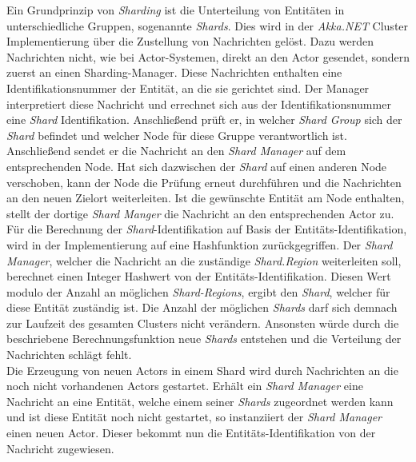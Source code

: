 Ein Grundprinzip von \textit{Sharding} ist die Unterteilung von Entitäten in unterschiedliche Gruppen, sogenannte \textit{Shards}. Dies wird in der \textit{Akka.NET} Cluster Implementierung über die Zustellung von Nachrichten gelöst. Dazu werden Nachrichten nicht, wie bei Actor-Systemen, direkt an den Actor gesendet, sondern zuerst an einen Sharding-Manager. Diese Nachrichten enthalten eine Identifikationsnummer der Entität, an die sie gerichtet sind. Der Manager interpretiert diese Nachricht und errechnet sich aus der Identifikationsnummer eine \textit{Shard} Identifikation. Anschließend prüft er, in welcher \textit{Shard Group} sich der \textit{Shard} befindet und welcher Node für diese Gruppe verantwortlich ist. Anschließend sendet er die Nachricht an den \textit{Shard Manager} auf dem entsprechenden Node. Hat sich dazwischen der \textit{Shard} auf einen anderen Node verschoben, kann der Node die Prüfung erneut durchführen und die Nachrichten an den neuen Zielort weiterleiten. Ist die gewünschte Entität am Node enthalten, stellt der dortige \textit{Shard Manger} die Nachricht an den entsprechenden Actor zu. \\
Für die Berechnung der \textit{Shard}-Identifikation auf Basis der Entitäts-Identifikation, wird in der Implementierung auf eine Hashfunktion zurückgegriffen. Der \textit{Shard Manager}, welcher die Nachricht an die zuständige \textit{Shard.Region} weiterleiten soll, berechnet einen Integer Hashwert von der Entitäts-Identifikation. Diesen Wert modulo der Anzahl an möglichen \textit{Shard-Regions}, ergibt den \textit{Shard}, welcher für diese Entität zuständig ist. Die Anzahl der möglichen \textit{Shards} darf sich demnach zur Laufzeit des gesamten Clusters nicht verändern. Ansonsten würde durch die beschriebene Berechnungsfunktion neue \textit{Shards} entstehen und die Verteilung der Nachrichten schlägt fehlt. \\
Die Erzeugung von neuen Actors in einem Shard wird durch Nachrichten an die noch nicht vorhandenen Actors gestartet. Erhält ein \textit{Shard Manager} eine Nachricht an eine Entität, welche einem seiner \textit{Shards} zugeordnet werden kann und ist diese Entität noch nicht gestartet, so instanziiert der \textit{Shard Manager} einen neuen Actor. Dieser bekommt nun die Entitäts-Identifikation von der Nachricht zugewiesen.
